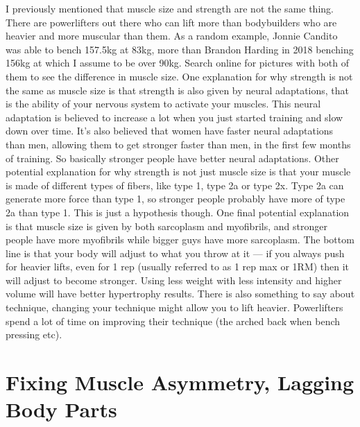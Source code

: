 \documentclass[openany, 12pt]{book}
\begin{document}
        I previously mentioned that muscle size and strength are not the same thing. There are powerlifters out there who can lift more than bodybuilders who are heavier and more muscular
        than them. As a random example, Jonnie Candito was able to bench 157.5kg at 83kg, more than Brandon Harding in 2018 benching 156kg at which I assume to be over 90kg.
        Search online for pictures with both of them to see the difference in muscle size.
        One explanation for why strength is not the same as muscle size is that strength is also given by neural adaptations, that is the ability of your nervous system to activate your muscles. This
        neural adaptation is believed to increase a lot when you just started training and slow down over time. It's also believed that women have faster neural adaptations than men, allowing them
        to get stronger faster than men, in the first few months of training. So basically stronger people have better neural adaptations.
        Other potential explanation for why strength is not just muscle size is that your muscle is made of different types of fibers, like type 1, type 2a or type 2x.
        Type 2a can generate more force than type 1, so stronger people probably
        have more of type 2a than type 1. This is just a hypothesis though.
        One final potential explanation is that muscle size is given by both sarcoplasm and myofibrils, and stronger people have more myofibrils while bigger guys have
        more sarcoplasm. The bottom line is that your body will adjust to what you throw at it --- if you always push for heavier lifts, even for 1 rep (usually referred to as 1 rep max or 1RM) then it
        will adjust to become stronger. Using less weight with less intensity and higher volume will have better hypertrophy results. There is also something to say about technique,
        changing your technique might allow you to lift heavier. Powerlifters spend a lot of time on improving their technique (the arched back when bench pressing etc).

        \section{Fixing Muscle Asymmetry, Lagging Body Parts}
\end{document}
